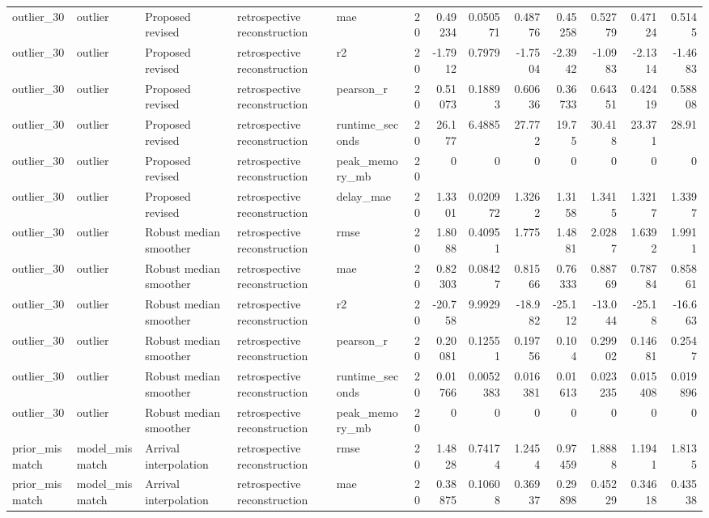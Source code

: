 \begin{table}[!htbp]
{{\begin{tabular}{lllllrrrrrrrr}
outlier_30 & outlier & Proposed revised & retrospective reconstruction & mae & 20 & 0.49234 & 0.050571 & 0.48776 & 0.45258 & 0.52779 & 0.47124 & 0.5145 \\
outlier_30 & outlier & Proposed revised & retrospective reconstruction & r2 & 20 & -1.7912 & 0.7979 & -1.7504 & -2.3942 & -1.0983 & -2.1314 & -1.4683 \\
outlier_30 & outlier & Proposed revised & retrospective reconstruction & pearson_r & 20 & 0.51073 & 0.18893 & 0.60636 & 0.36733 & 0.64351 & 0.42419 & 0.58808 \\
outlier_30 & outlier & Proposed revised & retrospective reconstruction & runtime_seconds & 20 & 26.177 & 6.4885 & 27.772 & 19.75 & 30.418 & 23.371 & 28.91 \\
outlier_30 & outlier & Proposed revised & retrospective reconstruction & peak_memory_mb & 20 & 0 & 0 & 0 & 0 & 0 & 0 & 0 \\
outlier_30 & outlier & Proposed revised & retrospective reconstruction & delay_mae & 20 & 1.3301 & 0.020972 & 1.3262 & 1.3158 & 1.3415 & 1.3217 & 1.3397 \\
outlier_30 & outlier & Robust median smoother & retrospective reconstruction & rmse & 20 & 1.8088 & 0.40951 & 1.775 & 1.4881 & 2.0287 & 1.6392 & 1.9911 \\
outlier_30 & outlier & Robust median smoother & retrospective reconstruction & mae & 20 & 0.82303 & 0.08427 & 0.81566 & 0.76333 & 0.88769 & 0.78784 & 0.85861 \\
outlier_30 & outlier & Robust median smoother & retrospective reconstruction & r2 & 20 & -20.758 & 9.9929 & -18.982 & -25.112 & -13.044 & -25.18 & -16.663 \\
outlier_30 & outlier & Robust median smoother & retrospective reconstruction & pearson_r & 20 & 0.20081 & 0.12551 & 0.19756 & 0.104 & 0.29902 & 0.14681 & 0.2547 \\
outlier_30 & outlier & Robust median smoother & retrospective reconstruction & runtime_seconds & 20 & 0.01766 & 0.0052383 & 0.016381 & 0.01613 & 0.023235 & 0.015408 & 0.019896 \\
outlier_30 & outlier & Robust median smoother & retrospective reconstruction & peak_memory_mb & 20 & 0 & 0 & 0 & 0 & 0 & 0 & 0 \\
prior_mismatch & model_mismatch & Arrival interpolation & retrospective reconstruction & rmse & 20 & 1.4828 & 0.74174 & 1.2454 & 0.97459 & 1.8888 & 1.1941 & 1.8135 \\
prior_mismatch & model_mismatch & Arrival interpolation & retrospective reconstruction & mae & 20 & 0.38875 & 0.10608 & 0.36937 & 0.29898 & 0.45229 & 0.34618 & 0.43538 \\

\end{tabular}}}
\end{table}
